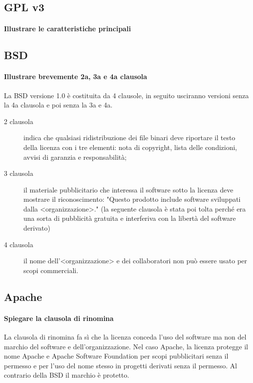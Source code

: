 \documentclass[a4paper]{article}
\begin{document}
		\subsection{GPL v3}
			
			\paragraph{Illustrare le caratteristiche principali}
		
		\subsection{BSD}
		
			\paragraph{Illustrare brevemente 2a, 3a e 4a clausola}
				La BSD versione 1.0 è costituita da 4 clausole, in seguito usciranno versioni senza la 4a clausola e poi senza la 3a e 4a.
				\begin{description}
					\item[2 clausola] indica che qualsiasi ridistribuzione dei file binari deve riportare il testo della licenza con i tre elementi: nota di copyright, lista delle condizioni, avvisi di garanzia e responsabilità;
					\item[3 clausola] il materiale pubblicitario che interessa il software sotto la licenza deve mostrare il riconoscimento:  "Questo prodotto include software sviluppati dalla <organizzazione>." (la seguente clausola è stata poi tolta perché era una sorta di pubblicità gratuita e interferiva con la libertà del software derivato)
					\item[4 clausola] il nome dell'<organizzazione> e dei collaboratori non può essere usato per scopi commerciali.
				\end{description}
			
		\subsection{Apache}
		
			\paragraph{Spiegare la clausola di rinomina}
				La clausola di rinomina fa sì che la licenza conceda l'uso del software ma non del marchio del software e dell'organizzazione.
				Nel caso Apache, la licenza protegge il nome Apache e Apache Software Foundation per scopi pubblicitari senza il permesso e per l'uso del nome stesso in progetti derivati senza il permesso. Al contrario della BSD il marchio è protetto.	
\end{document}
